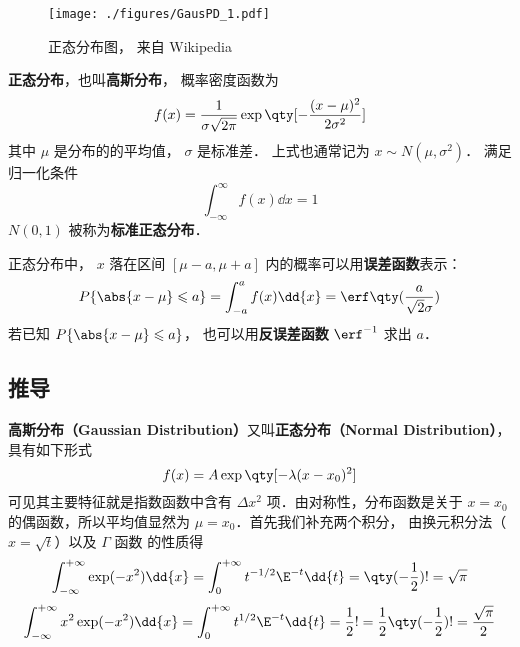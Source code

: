 
\begin{issues}
\issueTODO
\end{issues}


\begin{figure}[ht]
\centering
\texttt{[image: ./figures/GausPD\_1.pdf]}
\caption{正态分布图， 来自 Wikipedia} \label{GausPD_fig1}
\end{figure}

\textbf{正态分布}，也叫\textbf{高斯分布}， 概率密度函数为
\begin{equation}\label{GausPD_eq1}
f(x) = \frac{1}{\sigma \sqrt{2\pi }} \exp\qty[-\frac{(x - \mu )^2}{2\sigma ^2}]
\end{equation}
其中 $\mu$ 是分布的的平均值， $\sigma$ 是标准差． 上式也通常记为 $x \sim N(\mu,\sigma^2)$． 满足归一化条件
\begin{equation}
\int_{-\infty}^{\infty} f(x) \dd{x} = 1
\end{equation}
$N(0,1)$ 被称为\textbf{标准正态分布}．

正态分布中， $x$ 落在区间 $[\mu-a,\mu+a]$ 内的概率可以用\textbf{误差函数}表示：
\begin{equation}
P\{\abs{x-\mu} \leqslant a\} = \int_{-a}^a f(x)\dd{x} = \erf\qty(\frac{a}{\sqrt{2}\sigma})
\end{equation}
若已知 $P\{\abs{x-\mu} \leqslant a\}$， 也可以用\textbf{反误差函数} $\erf^{-1}$ 求出 $a$．


\subsection{推导}
\textbf{高斯分布（Gaussian Distribution）}又叫\textbf{正态分布（Normal Distribution）}， 具有如下形式
\begin{equation}\label{GausPD_eq2}
f(x) = A\exp\qty[-\lambda (x - x_0)^2]
\end{equation}
可见其主要特征就是指数函数中含有 $\Delta x^2$ 项．由对称性，分布函数是关于 $x =x_0$ 的偶函数，所以平均值显然为 $\mu = x_0$．首先我们补充两个积分， 由换元积分法（$x=\sqrt{t}$）以及 $\Gamma$ 函数 的性质得
\begin{equation}\label{GausPD_eq3}
\int_{-\infty }^{+\infty } \exp (-x^2)\dd{x}  = \int_0^{+\infty} t^{-1/2}\E^{ - t} \dd{t}  = \qty(-\frac12)! = \sqrt \pi 
\end{equation}
\begin{equation}\label{GausPD_eq4}
\int_{-\infty}^{+\infty} x^2\exp(-x^2)\dd{x}  = \int_0^{+\infty} t^{1/2}\E^{-t} \dd{t}  = \frac12 ! = \frac12 \qty(-\frac12)! = \frac{\sqrt\pi}{2}
\end{equation}

